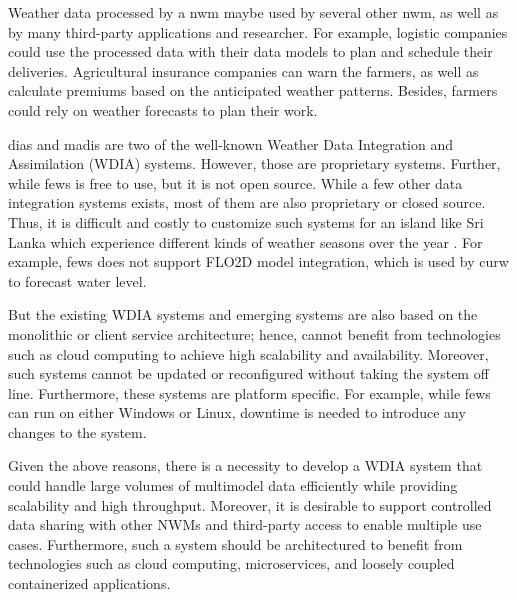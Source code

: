 Weather data processed by a \acrshort{nwm} maybe used by several other \acrshort{nwm}, as well as by many third-party applications and researcher. For example, logistic companies could use the processed data with their data models to plan and schedule their deliveries. Agricultural insurance companies can warn the farmers, as well as calculate premiums based on the anticipated weather patterns. Besides, farmers could rely on weather forecasts to plan their work.

\acrfull{dias} \cite{Kawasaki2018DataReduction} and \acrfull{madis} \cite{Macdermaid2005ArchitectureP2.39} are two of the well-known Weather Data Integration and Assimilation (WDIA) systems. However, those are proprietary systems. Further, while \acrfull{fews} \cite{Werner2013TheSystem} is free to use, but it is not open source. While a few other data integration systems exists, most of them are also proprietary or closed source. Thus, it is difficult and costly to customize such systems for an island like Sri Lanka which experience different kinds of weather seasons over the year \cite{NaveendrakumarFiveLanka}.
For example, \acrshort{fews} does not support FLO2D model integration, which is used by \acrshort{curw} to forecast water level.

 But the existing WDIA systems and emerging systems are also based on the monolithic or client service architecture; hence, cannot benefit from technologies such as cloud computing to achieve high scalability and availability. Moreover, such systems cannot be updated or reconfigured without taking the system off line. Furthermore, these systems are platform specific. For example, while \acrshort{fews} can run on either Windows or Linux, downtime is needed to introduce any changes to the system. 

Given the above reasons, there is a necessity to develop a WDIA system that could handle large volumes of multimodel data efficiently while providing scalability and high throughput. Moreover, it is desirable to support controlled data sharing with other NWMs and third-party access to enable multiple use cases. Furthermore, such a system should be architectured to benefit from technologies such as cloud computing, microservices, and loosely coupled containerized applications.

